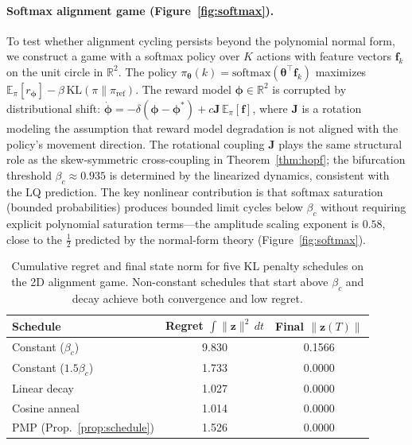 \documentclass[10pt]{article}
\newcommand{\btheta}{\bm{\theta}}
\newcommand{\bphi}{\bm{\phi}}
\newcommand{\bz}{\bm{z}}
\newcommand{\R}{\mathbb{R}}
\newcommand{\E}{\mathbb{E}}
\newcommand{\KL}{\mathrm{KL}}
\begin{document}
\paragraph{Softmax alignment game (Figure~\ref{fig:softmax}).}
To test whether alignment cycling persists beyond the polynomial normal form, we construct a game with a softmax policy over $K$ actions with feature vectors $\bm{f}_k$ on the unit circle in $\R^2$.
The policy $\pi_\btheta(k) = \mathrm{softmax}(\btheta^\top \bm{f}_k)$ maximizes $\E_\pi[r_\bphi] - \beta\,\KL(\pi \| \pi_{\mathrm{ref}})$.
The reward model $\bphi \in \R^2$ is corrupted by distributional shift: $\dot{\bphi} = -\delta(\bphi - \bphi^*) + c \bm{J}\,\E_\pi[\bm{f}]$, where $\bm{J}$ is a rotation modeling the assumption that reward model degradation is not aligned with the policy's movement direction.
The rotational coupling $\bm{J}$ plays the same structural role as the skew-symmetric cross-coupling in Theorem~\ref{thm:hopf}; the bifurcation threshold $\beta_c \approx 0.935$ is determined by the linearized dynamics, consistent with the LQ prediction.
The key nonlinear contribution is that softmax saturation (bounded probabilities) produces bounded limit cycles below $\beta_c$ without requiring explicit polynomial saturation terms---the amplitude scaling exponent is $0.58$, close to the $\tfrac{1}{2}$ predicted by the normal-form theory (Figure~\ref{fig:softmax}).

\begin{table}[h]
\centering
\small
\begin{tabular}{lcc}
\toprule
Schedule & Regret $\int \|\bz\|^2\,dt$ & Final $\|\bz(T)\|$ \\
\midrule
Constant ($\beta_c$) & 9.830 & 0.1566 \\
Constant ($1.5\beta_c$) & 1.733 & 0.0000 \\
Linear decay & 1.027 & 0.0000 \\
Cosine anneal & 1.014 & 0.0000 \\
PMP (Prop.~\ref{prop:schedule}) & 1.526 & 0.0000 \\
\bottomrule
\end{tabular}
\caption{Cumulative regret and final state norm for five KL penalty schedules on the 2D alignment game. Non-constant schedules that start above $\beta_c$ and decay achieve both convergence and low regret.}
\label{tab:regret}
\end{table}
\end{document}
